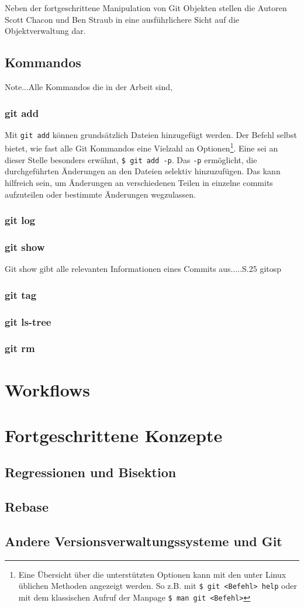 Neben der fortgeschrittene Manipulation von Git Objekten stellen die Autoren
Scott Chacon und Ben Straub in \cite[S.~408-418]{progit} eine ausführlichere
Sicht auf die Objektverwaltung dar.

\subsection{Kommandos}\label{sec:commands}
Note...Alle Kommandos die in der Arbeit sind,

\subsubsection{git add}\label{sec:gitadd}
Mit \texttt{git add} können grundsätzlich Dateien hinzugefügt werden. Der
Befehl selbst bietet, wie fast alle Git Kommandos eine Vielzahl an
Optionen\footnote{Eine Übersicht über die unterstützten Optionen kann mit den
unter Linux üblichen Methoden angezeigt werden. So z.B. mit \texttt{\$ git <Befehl>
help} oder mit dem klassischen Aufruf der Manpage \texttt{\$ man git <Befehl>}}.
Eine sei an dieser Stelle besonders erwähnt, \texttt{\$ git add -p}. Das
\texttt{-p} ermöglicht, die durchgeführten Änderungen an den Dateien selektiv
hinzuzufügen. Das kann hilfreich sein, um Änderungen an verschiedenen Teilen in
einzelne \glspl{commit} aufzuteilen oder bestimmte Änderungen wegzulassen.

\subsubsection{git log}\label{sec:gitlog}
\subsubsection{git show}\label{sec:gitshow}
Git show gibt alle relevanten Informationen eines Commits aus.....S.25 gitosp
\subsubsection{git tag}
\subsubsection{git ls-tree}
\subsubsection{git rm}

\section{Workflows}\label{sec:Workflows}
\section{Fortgeschrittene Konzepte}
\label{sec:FortgeschritteneKonzepte}
\subsection{Regressionen und Bisektion}\label{sec:bisec}
\subsection{Rebase}\label{sec:rebase}
\subsection{Andere Versionsverwaltungssysteme und Git}
\label{sec:AndereVersionsverwaltungssystemeundGit}
